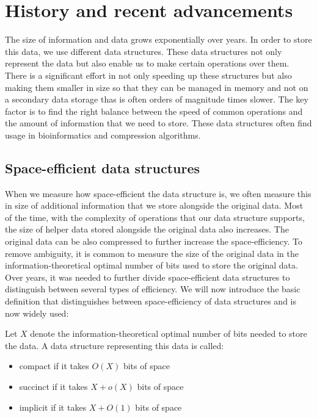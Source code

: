 \chapter{History and recent advancements}
\label{kap:kap1}

The size of information and data grows exponentially over years. In order to store this data, we use different data structures. These data structures not only represent the data but also enable us to make certain operations over them. There is a significant effort in not only speeding up these structures but also making them smaller in size so that they can be managed in memory and not on a secondary data storage thas is often orders of magnitude times slower. The key factor is to find the right balance between the speed of common operations and the amount of information that we need to store. These data structures often find usage in bioinformatics and compression algorithms.

\section{Space-efficient data structures}

When we measure how space-efficient the data structure is, we often measure this in size of additional information that we store alongside the original data. Most of the time, with the complexity of operations that our data structure supports, the size of helper data stored alongside the original data also increases. The original data can be also compressed to further increase the space-efficiency. To remove ambiguity, it is common to measure the size of the original data in the information-theoretical optimal number of bits used to store the original data. Over years, it was needed to further divide space-efficient data structures to distinguish between several types of efficiency. We will now introduce the basic definition that distinguishes between space-efficiency of data structures and is now widely used:

\begin{theorem}
Let $X$ denote the information-theoretical optimal number of bits needed to store the data. A data structure representing this data is called:
\begin{itemize}
    \item compact if it takes $O(X)$ bits of space
    \item succinct if it takes $X + o(X)$ bits of space
    \item implicit if it takes $X + O(1)$ bits of space
\end{itemize}
\end{theorem}

